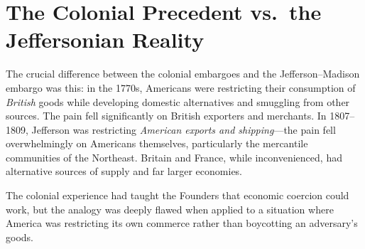 \documentclass[12pt]{article}
\begin{document}
\section{The Colonial Precedent vs.\ the Jeffersonian Reality}

The crucial difference between the colonial embargoes and the Jefferson--Madison
embargo was this: in the 1770s, Americans were restricting their consumption of
\emph{British} goods while developing domestic alternatives and smuggling from
other sources. The pain fell significantly on British exporters and merchants. In
1807--1809, Jefferson was restricting \emph{American exports and shipping}---the
pain fell overwhelmingly on Americans themselves, particularly the mercantile
communities of the Northeast. Britain and France, while inconvenienced, had
alternative sources of supply and far larger economies.

The colonial experience had taught the Founders that economic coercion could
work, but the analogy was deeply flawed when applied to a situation where America
was restricting its own commerce rather than boycotting an adversary's goods.
\end{document}
